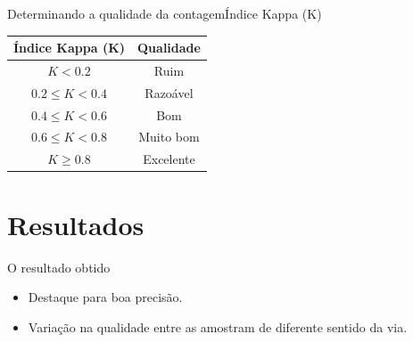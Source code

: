 \begin{frame}{Determinando a qualidade da contagem}{Índice Kappa (K)}
  \begin{center}
    \begin{tabular}{cc}
    \hline
    \textbf{Índice Kappa (K)} & \textbf{Qualidade} \\
    \hline
      $K < 0.2$ & Ruim \\
      $0.2 \leq K < 0.4$ & Razoável \\
      $0.4 \leq K < 0.6$ & Bom \\
      $0.6 \leq K < 0.8$ & Muito bom \\
      $K \geq 0.8$ & Excelente \\
    \hline
    \end{tabular}
  \end{center}
\end{frame}



\section{Resultados} %
\label{sec:resultados}

\begin{frame}{O resultado obtido}

    \pause
    \begin{itemize}
      \item Destaque para boa precisão.
      \item Variação na qualidade entre as amostram de diferente sentido da via.
    \end{itemize}
\end{frame}

